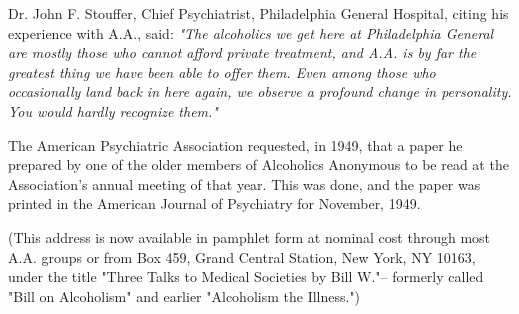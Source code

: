 \begin{biblechapter}
    Dr. John F. Stouffer, Chief Psychiatrist, 
    Philadelphia General Hospital, 
    citing his experience with A.A., said:
\verse\emph{ "The alcoholics we get here at Philadelphia General 
    are mostly those who cannot afford private treatment, 
    and A.A. is by far the greatest thing we have been able to offer them.
\verse Even among those who occasionally land back in here again, 
    we observe a profound change in personality.
\verse You would hardly recognize them."
}
\end{biblechapter}
 
\begin{biblechapter}
    The American Psychiatric Association requested, in 1949, 
    that a paper he prepared 
    by one of the older members of Alcoholics Anonymous 
    to be read at the Association's annual meeting of that year.
\verse This was done, 
    and the paper was printed in the American Journal of Psychiatry 
    for November, 1949.

\verse (This address is now available in pamphlet form 
    at nominal cost through most A.A. groups 
    or from Box 459, Grand Central Station, New York, NY 10163, 
    under the title "Three Talks to Medical Societies by Bill W."--
    formerly called "Bill on Alcoholism" 
    and earlier "Alcoholism the Illness.")
\end{biblechapter}

